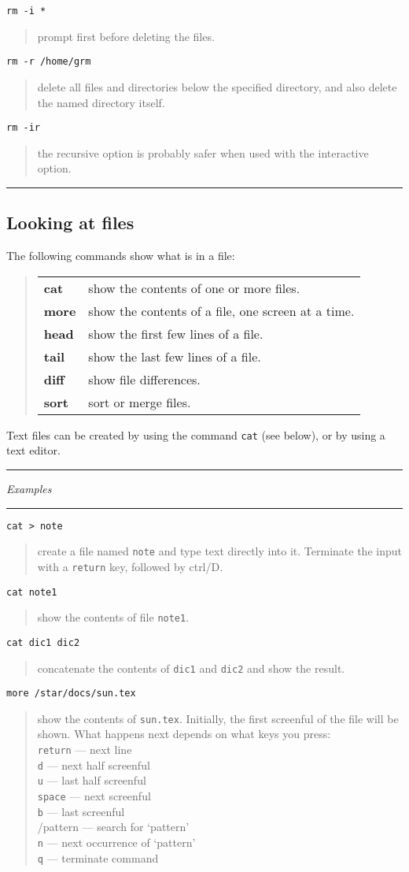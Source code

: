 \documentclass[twoside,11pt,nolof]{starlink}
\providecommand{\example}[2]{\goodbreak
                         \texttt{#1}
                         \vspace*{-4mm}
                         \begin{quote}
                           {\small #2}
                         \end{quote}
                        }
\providecommand{\exbegin}{\begin{center}
                      \rule{18mm}{0.3mm}
                      \emph{Examples}
                      \rule{18mm}{0.3mm}
                      \end{center}
                     }
\providecommand{\exend}{\begin{center}
                    \rule{50mm}{0.3mm}
                    \end{center}
                   }
\begin{document}
\example{rm -i *}
{prompt first before deleting the files.}

\example{rm -r /home/grm}
{delete all files and directories below the specified directory, and also
delete the named directory itself.}

\example{rm -ir}
{the recursive option is probably safer when used with the interactive option.}

\exend

\subsection{Looking at files}

The following commands show what is in a file:

\begin{quote}
\begin{tabular}{lp{74mm}}

\textbf{cat}  & show the contents of one or more files.\\
\textbf{more} & show the contents of a file, one screen at a time.\\
\textbf{head} & show the first few lines of a file.\\
\textbf{tail} & show the last few lines of a file.\\
\textbf{diff} & show file differences.\\
\textbf{sort} & sort or merge files.

\end{tabular}
\end{quote}

Text files can be created by using the command \texttt{cat} (see below), or by
using a text editor.

\goodbreak

\exbegin

\example{cat > note}
{create a file named \texttt{note} and type text directly into it.
Terminate the input with a \texttt{return}  key, followed by ctrl/D.}

\example{cat note1}
{show the contents of file \texttt{note1}.}

\example{cat dic1 dic2}
{concatenate the contents of \texttt{dic1} and \texttt{dic2} and show the result.}

\example{more /star/docs/sun.tex}
{show the contents of \texttt{sun.tex}.
Initially, the first screenful of the file will be shown.
What happens next depends on what keys you press:\\
\texttt{return}  --- next line\\
\texttt{d} --- next half screenful\\
\texttt{u} --- last half screenful\\
\texttt{space} --- next screenful\\
\texttt{b} --- last screenful\\
/pattern --- search for `pattern'\\
\texttt{n} --- next occurrence of `pattern'\\
\texttt{q} --- terminate command}
\end{document}
